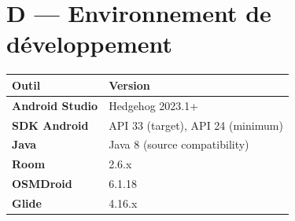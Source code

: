 \documentclass[a4paper,12pt,openany]{report}
\begin{document}
\section*{D — Environnement de développement}

\begin{tabularx}{\textwidth}{>{\bfseries}l X}
  \toprule
  Outil & Version \\
  \midrule
  Android Studio    & Hedgehog 2023.1+ \\
  SDK Android       & API 33 (target), API 24 (minimum) \\
  Java              & Java 8 (source compatibility) \\
  Room              & 2.6.x \\
  OSMDroid          & 6.1.18 \\
  Glide             & 4.16.x \\
  \bottomrule
\end{tabularx}
\end{document}
